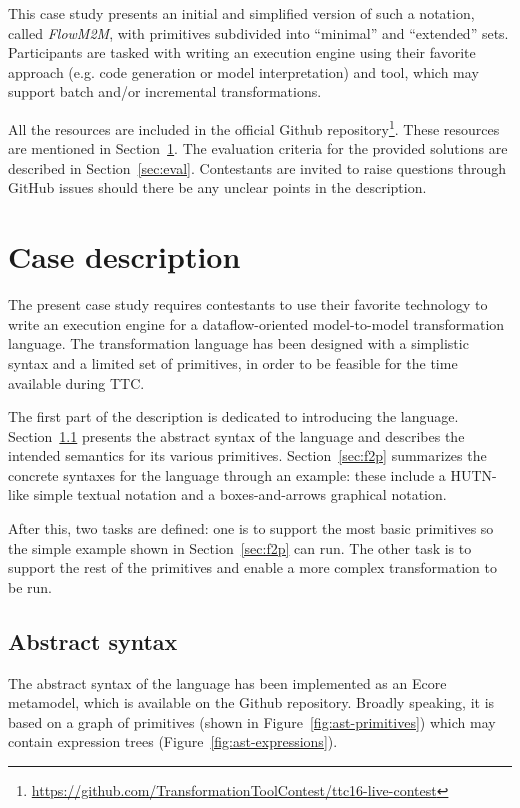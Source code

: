 \documentclass[a4paper]{scrartcl}
\newcommand{\FlowMM}{\emph{FlowM2M}\xspace}
\begin{document}
This case study presents an initial and simplified version of such a
notation, called \FlowMM, with primitives subdivided into ``minimal''
and ``extended'' sets. Participants are tasked with writing an
execution engine using their favorite approach (e.g. code generation
or model interpretation) and tool, which may support batch and/or
incremental transformations.

All the resources are included in the official Github
repository\footnote{\url{https://github.com/TransformationToolContest/ttc16-live-contest}}. These
resources are mentioned in Section~\ref{sec:case}. The evaluation
criteria for the provided solutions are described in
Section~\ref{sec:eval}. Contestants are invited to raise questions
through GitHub issues should there be any unclear points in the
description.

\section{Case description}
\label{sec:case}

The present case study requires contestants to use their favorite
technology to write an execution engine for a dataflow-oriented
model-to-model transformation language. The transformation language
has been designed with a simplistic syntax and a limited set of
primitives, in order to be feasible for the time available during TTC.

The first part of the description is dedicated to introducing the
language. Section~\ref{sec:asyn} presents the abstract syntax of the
language and describes the intended semantics for its various
primitives. Section~\ref{sec:f2p} summarizes the concrete syntaxes for
the language through an example: these include a HUTN-like simple
textual notation and a boxes-and-arrows graphical notation.

After this, two tasks are defined: one is to support the most basic
primitives so the simple example shown in Section~\ref{sec:f2p} can
run. The other task is to support the rest of the primitives and
enable a more complex transformation to be run.

\subsection{Abstract syntax}
\label{sec:asyn}

The abstract syntax of the language has been implemented as an Ecore
metamodel, which is available on the Github repository. Broadly
speaking, it is based on a graph of primitives (shown in
Figure~\ref{fig:ast-primitives}) which may contain expression trees
(Figure~\ref{fig:ast-expressions}).
\end{document}
